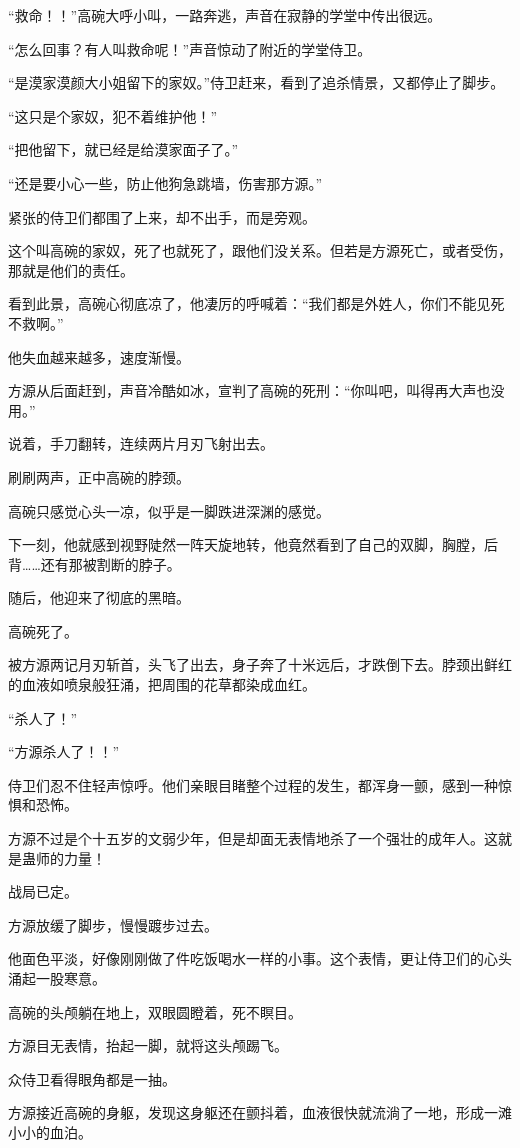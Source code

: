 \begin{this_body}
“救命！！”高碗大呼小叫，一路奔逃，声音在寂静的学堂中传出很远。

“怎么回事？有人叫救命呢！”声音惊动了附近的学堂侍卫。

“是漠家漠颜大小姐留下的家奴。”侍卫赶来，看到了追杀情景，又都停止了脚步。

“这只是个家奴，犯不着维护他！”

“把他留下，就已经是给漠家面子了。”

“还是要小心一些，防止他狗急跳墙，伤害那方源。”

紧张的侍卫们都围了上来，却不出手，而是旁观。

这个叫高碗的家奴，死了也就死了，跟他们没关系。但若是方源死亡，或者受伤，那就是他们的责任。

看到此景，高碗心彻底凉了，他凄厉的呼喊着：“我们都是外姓人，你们不能见死不救啊。”

他失血越来越多，速度渐慢。

方源从后面赶到，声音冷酷如冰，宣判了高碗的死刑：“你叫吧，叫得再大声也没用。”

说着，手刀翻转，连续两片月刃飞射出去。

刷刷两声，正中高碗的脖颈。

高碗只感觉心头一凉，似乎是一脚跌进深渊的感觉。

下一刻，他就感到视野陡然一阵天旋地转，他竟然看到了自己的双脚，胸膛，后背……还有那被割断的脖子。

随后，他迎来了彻底的黑暗。

高碗死了。

被方源两记月刃斩首，头飞了出去，身子奔了十米远后，才跌倒下去。脖颈出鲜红的血液如喷泉般狂涌，把周围的花草都染成血红。

“杀人了！”

“方源杀人了！！”

侍卫们忍不住轻声惊呼。他们亲眼目睹整个过程的发生，都浑身一颤，感到一种惊惧和恐怖。

方源不过是个十五岁的文弱少年，但是却面无表情地杀了一个强壮的成年人。这就是蛊师的力量！

战局已定。

方源放缓了脚步，慢慢踱步过去。

他面色平淡，好像刚刚做了件吃饭喝水一样的小事。这个表情，更让侍卫们的心头涌起一股寒意。

高碗的头颅躺在地上，双眼圆瞪着，死不瞑目。

方源目无表情，抬起一脚，就将这头颅踢飞。

众侍卫看得眼角都是一抽。

方源接近高碗的身躯，发现这身躯还在颤抖着，血液很快就流淌了一地，形成一滩小小的血泊。


\end{this_body}
